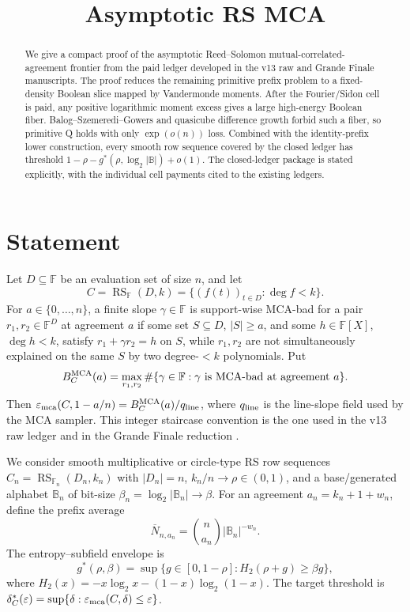 \documentclass[11pt,a4paper]{amsart}
\title{Asymptotic RS MCA}
\date{}
\numberwithin{equation}{section}
\theoremstyle{remark}
\DeclareMathOperator{\RS}{RS}
\newcommand{\F}{\mathbb F}
\newcommand{\B}{\mathbb B}
\newcommand{\barN}{\overline N}
\newcommand{\eps}{\varepsilon}
\begin{document}
\begin{abstract}
We give a compact proof of the asymptotic Reed--Solomon mutual-correlated-agreement frontier from the paid ledger developed in the v13 raw and Grande Finale manuscripts.  The proof reduces the remaining primitive prefix problem to a fixed-density Boolean slice mapped by Vandermonde moments.  After the Fourier/Sidon cell is paid, any positive logarithmic moment excess gives a large high-energy Boolean fiber.  Balog--Szemeredi--Gowers and quasicube difference growth forbid such a fiber, so primitive Q holds with only \(\exp(o(n))\) loss.  Combined with the identity-prefix lower construction, every smooth row sequence covered by the closed ledger has threshold \(1-\rho-g^*(\rho,\log_2|\B|)+o(1)\).  The closed-ledger package is stated explicitly, with the individual cell payments cited to the existing ledgers.
\end{abstract}

\maketitle

\section{Statement}

Let \(D\subseteq \F\) be an evaluation set of size \(n\), and let
\[
        C=\RS_{\F}(D,k)=\{(f(t))_{t\in D}:\deg f<k\}.
\]
For \(a\in\{0,\ldots,n\}\), a finite slope \(\gamma\in\F\) is support-wise MCA-bad for a pair \(r_1,r_2\in\F^D\) at agreement \(a\) if some set \(S\subseteq D\), \(|S|\ge a\), and some \(h\in\F[X]\), \(\deg h<k\), satisfy \(r_1+\gamma r_2=h\) on \(S\), while \(r_1,r_2\) are not simultaneously explained on the same \(S\) by two degree-\(<k\) polynomials.  Put
\[
        B_C^{\rm MCA}(a)
        =\max_{r_1,r_2}\#\{\gamma\in\F:\gamma\text{ is MCA-bad at agreement }a\}.
\]
Then \(\eps_{\rm mca}(C,1-a/n)=B_C^{\rm MCA}(a)/q_{\rm line}\), where \(q_{\rm line}\) is the line-slope field used by the MCA sampler.  This integer staircase convention is the one used in the v13 raw ledger \cite{Cho26CapV13} and in the Grande Finale reduction \cite{Cho26Grande}.

We consider smooth multiplicative or circle-type RS row sequences \(C_n=\RS_{\F_n}(D_n,k_n)\) with \(|D_n|=n\), \(k_n/n\to\rho\in(0,1)\), and a base/generated alphabet \(\B_n\) of bit-size \(\beta_n=\log_2|\B_n|\to\beta\).  For an agreement \(a_n=k_n+1+w_n\), define the prefix average
\[
        \barN_{n,a_n}=\binom n{a_n}|\B_n|^{-w_n}.
\]
The entropy--subfield envelope is
\[
        g^*(\rho,\beta)=\sup\{g\in[0,1-\rho]:H_2(\rho+g)\ge \beta g\},
\]
where \(H_2(x)=-x\log_2x-(1-x)\log_2(1-x)\).  The target threshold is \(\delta_C^*(\eps)=\sup\{\delta:\eps_{\rm mca}(C,\delta)\le\eps\}\).
\end{document}
